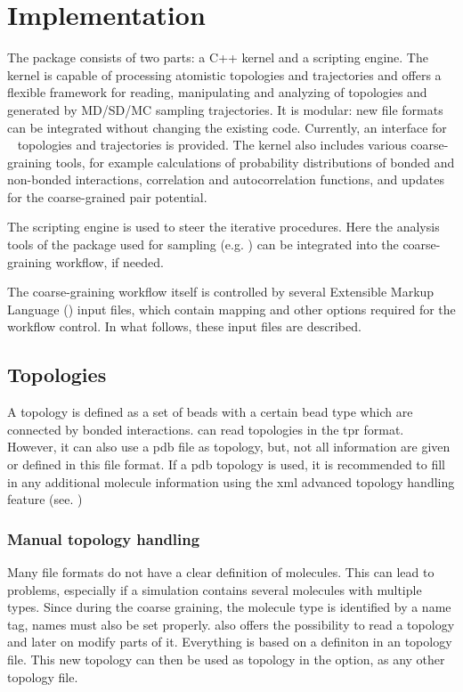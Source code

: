 \chapter{Implementation}

The package consists of two parts: a C++ kernel and a scripting engine. The kernel is capable of processing atomistic topologies and trajectories and offers a flexible framework for reading, manipulating and analyzing of topologies and generated by MD/SD/MC sampling trajectories. It is modular: new file formats can be integrated without changing the existing code. Currently, an interface for \gromacs~\cite{gromacs4} topologies and trajectories is provided.
%
The kernel also includes various coarse-graining tools, for example calculations of probability distributions of bonded and non-bonded interactions, correlation and autocorrelation functions, and updates for the coarse-grained pair potential.

The scripting engine is used to steer the iterative procedures. Here the analysis tools of the package used for sampling (e.g. \gromacs) can be integrated into the coarse-graining workflow, if needed.

The coarse-graining workflow itself is controlled by several Extensible Markup Language (\xml) input files, which contain mapping and other options required for the workflow control. In what follows, these input files are described.




\section{Topologies}
A topology is defined as a set of beads with a certain bead type which are connected by bonded interactions.
\votca can read topologies in the \gromacs tpr format. However, it can also use a pdb file as topology, but, not all information are given or defined in this file format. If a pdb topology is used, it is recommended to fill in any additional molecule information using the xml advanced topology handling feature (see. )
\subsection{Manual topology handling}
\label{sec:adv_topology}
Many file formats do not have a clear definition of molecules. This can lead to problems, especially if a simulation contains several molecules with multiple types. Since during the coarse graining, the molecule type is identified by a name tag, names must also be set properly. \votca also offers the possibility to read a topology and later on modify parts of it. Everything is based on a definiton in an \xml topology file. This new \xml topology can then be used as topology in the  option, as any other topology file.

